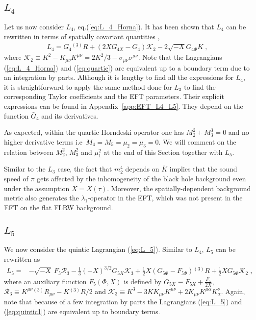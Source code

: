 \documentclass[a4paper,11pt]{article}
\numberwithin{equation}{section}
\begin{document}
\subsection{$L_4$}
Let us now consider $L_4$, eq.(\ref{eq:L_4_Horna}). It has been shown that $L_4$ can be rewritten in terms of spatially covariant quantities \cite{Gleyzes:2013ooa},
\begin{align}
L_4 = G_4 {}^{(3)}\!R + (2 X G_{4X} - G_4)\mathcal{K}_2 - 2 \sqrt{-X} G_{4 \Phi} K \label{eq:quartic} \;,
\end{align}
where $\mathcal{K}_2 \equiv K^2 - K_{\mu\nu} K^{\mu\nu} = 2K^2/3 - \sigma_{\mu\nu} \sigma^{\mu\nu}$. Note that the Lagrangians (\ref{eq:L_4_Horna}) and (\ref{eq:quartic}) are equivalent up to a boundary term due to an integration by parts. Although it is lengthy to find all the expressions for $L_4$, it is  straightforward to apply the same method done for $L_3$ to find the corresponding Taylor coefficients and the EFT parameters. Their explicit expressions can be found in Appendix~\ref{app:EFT_L4_L5}. They depend on the function $\bar{G}_4$ and its derivatives. 

As expected, within the quartic Horndeski operator one has $M_2^2 + M_3^3 = 0$ and no higher derivative terms i.e~$M_4 = M_5 = \mu_2 = \mu_3 = 0$. We will comment on the relation between $M_2^2$, $M_3^2$ and $\mu_1^2$ at the end of this Section together with $L_5$.

Similar to the $L_3$ case, the fact that $m_2^4$ depends on $\bar{K}$ implies that the sound speed of $\pi$ gets affected by the inhomogeneity of the black hole background even under the assumption $\bar{X}=\bar{X}(\tau)$. Moreover, the spatially-dependent background metric also generates the $\lambda_1$-operator in the EFT, which was not present in the EFT on the flat FLRW background. 

\subsection{$L_5$}
We now consider the quintic Lagrangian (\ref{eq:L_5}). Similar to $L_4$, $L_5$ can be rewritten as \cite{Gleyzes:2013ooa}
\begin{align}
L_5 = &-\sqrt{-X}~F_5 \mathcal{R}_3- \frac{1}{3} (-X)^{3/2} G_{5X} \mathcal{K}_3 + \frac{1}{2} X (G_{5\Phi} - F_{5\Phi}) {}^{(3)}\!R  + \frac{1}{2} X G_{5 \Phi} \mathcal{K}_2 \label{eq:quintic1} \;,
\end{align}
where an auxiliary function $F_5(\Phi,X)$ is defined by $G_{5X} \equiv F_{5X} + \frac{F_5}{2 X} $, $\mathcal{R}_3 \equiv K^{\mu\nu} {}^{(3)}\!R_{\mu\nu} - K {}^{(3)}\!R/2$
and $\mathcal{K}_3 \equiv K^3 - 3 K K_{\mu\nu} K^{\mu\nu} + 2 K_{\mu\nu} K^{\mu\alpha} K^\nu_{\alpha}$. Again, note that because of a few integration by parts the Lagrangians (\ref{eq:L_5}) and (\ref{eq:quintic1}) are equivalent up to boundary terms.
\end{document}
